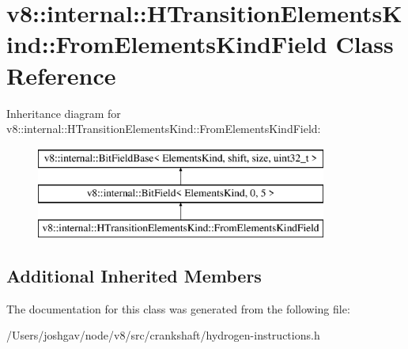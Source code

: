 \hypertarget{classv8_1_1internal_1_1_h_transition_elements_kind_1_1_from_elements_kind_field}{}\section{v8\+:\+:internal\+:\+:H\+Transition\+Elements\+Kind\+:\+:From\+Elements\+Kind\+Field Class Reference}
\label{classv8_1_1internal_1_1_h_transition_elements_kind_1_1_from_elements_kind_field}
Inheritance diagram for v8\+:\+:internal\+:\+:H\+Transition\+Elements\+Kind\+:\+:From\+Elements\+Kind\+Field\+:\begin{figure}[H]
\begin{center}
\leavevmode
\includegraphics[height=3.000000cm]{classv8_1_1internal_1_1_h_transition_elements_kind_1_1_from_elements_kind_field}
\end{center}
\end{figure}
\subsection*{Additional Inherited Members}


The documentation for this class was generated from the following file\+:\begin{DoxyCompactItemize}
\item 
/\+Users/joshgav/node/v8/src/crankshaft/hydrogen-\/instructions.\+h\end{DoxyCompactItemize}
